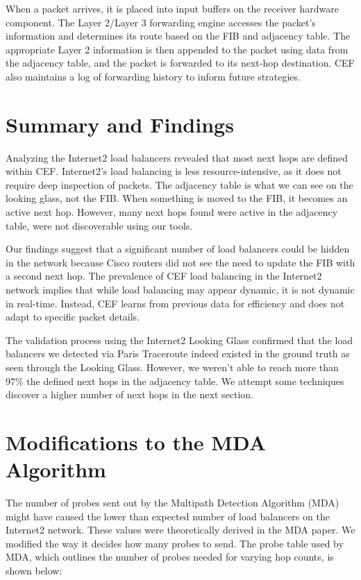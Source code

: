 \documentclass[12pt]{cwru_thesis}
\begin{document}
When a packet arrives, it is placed into input buffers on the receiver hardware component. The Layer 2/Layer 3 forwarding engine accesses the packet's information and determines its route based on the FIB and adjacency table. The appropriate Layer 2 information is then appended to the packet using data from the adjacency table, and the packet is forwarded to its next-hop destination. CEF also maintains a log of forwarding history to inform future strategies.

\section{Summary and Findings}

Analyzing the Internet2 load balancers revealed that most next hops are defined within CEF. Internet2's load balancing is less resource-intensive, as it does not require deep inspection of packets. The adjacency table is what we can see on the looking glass, not the FIB. When something is moved to the FIB, it becomes an active next hop. However, many next hops found were active in the adjacency table, were not discoverable using our tools.

Our findings suggest that a significant number of load balancers could be hidden in the network because Cisco routers did not see the need to update the FIB with a second next hop. The prevalence of CEF load balancing in the Internet2 network implies that while load balancing may appear dynamic, it is not dynamic in real-time. Instead, CEF learns from previous data for efficiency and does not adapt to specific packet details.

The validation process using the Internet2 Looking Glass confirmed that the load balancers we detected via Paris Traceroute indeed existed in the ground truth as seen through the Looking Glass. However, we weren't able to reach more than 97\% the defined next hops in the adjacency table. We attempt some techniques discover a higher number of next hops in the next section. 


\section{Modifications to the MDA Algorithm}

The number of probes sent out by the Multipath Detection Algorithm (MDA) might have caused the lower than expected number of load balancers on the Internet2 network. These values were theoretically derived in the MDA paper. We modified the way it decides how many probes to send. The probe table used by MDA, which outlines the number of probes needed for varying hop counts, is shown below:
\end{document}
